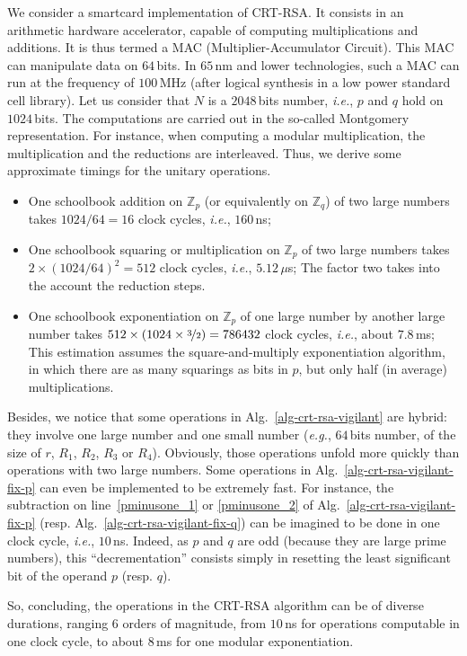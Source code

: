 \documentclass[10pt]{article}
\theoremstyle{definition}
\theoremstyle{theorem}
\newcommand{\Z}{\mathbb{Z}}
\newcommand{\ie}{\textit{i.e.}}
\newcommand{\eg}{\textit{e.g.}}
\begin{document}
We consider a smartcard implementation of CRT-RSA.
It consists in an arithmetic hardware accelerator, capable of computing multiplications and additions.
It is thus termed a MAC (Multiplier-Accumulator Circuit).
This MAC can manipulate data on $64$\,bits.
In $65$\,nm and lower technologies, such a MAC can run at the frequency of $100$\,MHz
(after logical synthesis in a low power standard cell library).
Let us consider that $N$ is a $2048$\,bits number, \ie, $p$ and $q$ hold on $1024$\,bits.
The computations are carried out in the so-called Montgomery representation.
For instance, when computing a modular multiplication, the multiplication and the reductions are interleaved.
Thus, we derive some approximate timings for the unitary operations.
\begin{itemize}
\item One schoolbook addition on $\Z_p$ (or equivalently on $\Z_q$) of two large numbers takes $1024/64=16$ clock cycles, \ie, $160$\,ns;
\item One schoolbook squaring or multiplication on $\Z_p$ of two large numbers takes $2 \times (1024/64)^2=512$ clock cycles, \ie, $5.12$\,$\mu$s;
The factor two takes into the account the reduction steps.
\item One schoolbook exponentiation on $\Z_p$ of one large number by another large number takes $512 \times (1024 \times \nicefrac32)=786432$ clock cycles, \ie, about $7.8$\,ms;
This estimation assumes the square-and-multiply exponentiation algorithm, in which there are as many squarings as bits in $p$,
but only half (in average) multiplications.
\end{itemize}
Besides, we notice that some operations in Alg.~\ref{alg-crt-rsa-vigilant} are hybrid:
they involve one large number and one small number (\eg, $64$\,bits number, of the size of $r$, $R_1$, $R_2$, $R_3$ or $R_4$).
Obviously, those operations unfold more quickly than operations with two large numbers.
Some operations in Alg.~\ref{alg-crt-rsa-vigilant-fix-p} can even be implemented to be extremely fast.
For instance, the subtraction on line~\ref{pminusone_1} or \ref{pminusone_2} of Alg.~\ref{alg-crt-rsa-vigilant-fix-p} (resp. Alg.~\ref{alg-crt-rsa-vigilant-fix-q}) can be imagined to be done in one clock cycle, \ie, $10$\,ns.
Indeed, as $p$ and $q$ are odd (because they are large prime numbers),
this ``decrementation'' consists simply in resetting the least significant bit of the operand $p$ (resp. $q$).

So, concluding, the operations in the CRT-RSA algorithm can be of diverse durations,
ranging $6$ orders of magnitude,
from $10$\,ns for operations computable in one clock cycle,
to about $8$\,ms for one modular exponentiation.
\end{document}
